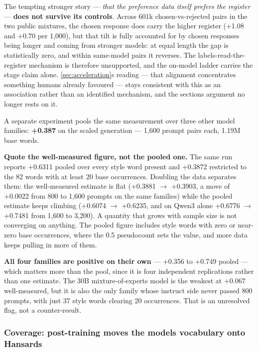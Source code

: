 The tempting stronger story --- \emph{that the preference data itself prefers the
register} --- \textbf{does not survive its controls}. Across 601k chosen-vs-rejected
pairs in the two public mixtures, the chosen response does carry the higher
register (+1.08 and +0.70 per 1,000), but that tilt is fully accounted for by
chosen responses being longer and coming from stronger models: at equal length
the gap is statistically zero, and within same-model pairs it reverses. The
labels-read-the-register mechanism is therefore unsupported, and the on-model
ladder carries the stage claim alone. \cref{sec:acceleration}\textquotesingle s reading --- that alignment
concentrates something humans already favoured --- stays consistent with this as
an association rather than an identified mechanism, and the section\textquotesingle s argument
no longer rests on it.

A separate experiment pools the same measurement over three other model
families: \textbf{+0.387} on the scaled generation --- 1,600 prompt pairs each, 1.19M
base words.

\textbf{Quote the well-measured figure, not the pooled one.} The same run reports
+0.6311 pooled over every style word present and +0.3872 restricted to the 82
words with at least 20 base occurrences. Doubling the data separates them: the
well-measured estimate is flat (+0.3881 \(\rightarrow\) +0.3903, a move of +0.0022 from 800
to 1,600 prompts on the same families) while the pooled estimate keeps climbing
(+0.6074 \(\rightarrow\) +0.6235, and on Qwen3 alone +0.6776 \(\rightarrow\) +0.7481 from 1,600 to 3,200).
A quantity that grows with sample size is not converging on anything. The
pooled figure includes style words with zero or near-zero base occurrences,
where the 0.5 pseudocount sets the value, and more data keeps pulling in more
of them.

\textbf{All four families are positive on their own} --- +0.356 to +0.749 pooled ---
which matters more than the pool, since it is four independent replications
rather than one estimate. The 30B mixture-of-experts model is the weakest at
+0.067 well-measured, but it is also the only family whose instruct side never
passed 800 prompts, with just 37 style words clearing 20 occurrences. That is
an unresolved flag, not a counter-result.

\subsubsection{Coverage: post-training moves the model\textquotesingle s vocabulary onto Hansard\textquotesingle s}\label{sec:coverage}

